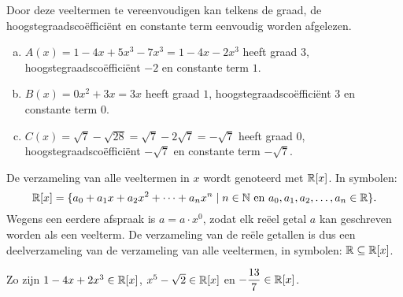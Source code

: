 \documentclass{ximera}
\begin{document}
\begin{example} 
Door deze veeltermen te vereenvoudigen kan telkens de graad, de hoogstegraadscoëfficiënt en constante term eenvoudig worden afgelezen. 
\begin{enumerate}[(a)]
\item
\(A(x) = 1-4x+5x^3-7x^3 = 1 - 4x - 2x^3\) heeft graad \(3\), hoogstegraadscoëfficiënt \(-2\) en constante term \(1\).
\item
\(B(x) = 0x^2 + 3x = 3x\) heeft graad \(1\), hoogstegraadscoëfficiënt \(3\) en constante term \(0\).
\item
\(C(x) = \sqrt{7}-\sqrt{28} = \sqrt{7}-2\sqrt{7} = -\sqrt{7}\) heeft graad \(0\), hoogstegraadscoëfficiënt \(-\sqrt{7}\) en constante term \(-\sqrt{7}\).
\end{enumerate}
\end{example} 


\begin{notation}

    De verzameling van alle veeltermen in \(x\) wordt genoteerd met \(\mathbb{R}[x]\). In symbolen:
    \[
    \mathbb{R}[x] = \{a_0 + a_1 x + a_2 x^2 + \dots + a_n x^n \mid \text{\(n \in \ensuremath{\mathbb{N}}\) en \(a_0,a_1,a_2,\ldots,a_n \in \ensuremath{\mathbb{R}}\)} \}.
    \]
    Wegens een eerdere afspraak is \(a = a\cdot x^0\), zodat elk reëel getal \(a\) kan geschreven worden als een veelterm. De verzameling van de reële getallen is dus een deelverzameling
    van de verzameling van alle veeltermen, in symbolen: \(\mathbb{R} \subseteq \mathbb{R}[x]\).
    
    
    \begin{example} 
       Zo zijn \(1-4x+2x^3 \in \mathbb{R}[x]\), \(x^5-\sqrt{2} \in \mathbb{R}[x]\) en \(\displaystyle -\frac{13}{7} \in \mathbb{R}[x]\).   
    \end{example} 
    
\end{notation}




\renewcommand{\TJa}{\makebox[2.5cm]{een veelterm }}
\renewcommand{\TNee}{\makebox[2.5cm]{eeen veelterm}}
  
\end{document}
